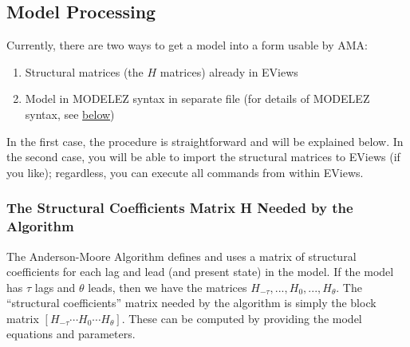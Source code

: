 \documentclass[12pt]{article}
\begin{document}
\subsection{Model Processing}
Currently,  there are two ways to get a model into a form usable by AMA:
\begin{enumerate}
\item Structural matrices (the $H$ matrices) already in EViews
\item Model in MODELEZ syntax in separate file (for details of MODELEZ syntax, see \hyperlink{mez}{below})
\end{enumerate}
In the first case, the procedure is straightforward and will be explained below.  In the second case, you will be able to import the structural matrices to EViews (if you like); regardless, you can execute all commands from within EViews. \\

\subsubsection{The Structural Coefficients Matrix H Needed by the Algorithm}
The Anderson-Moore Algorithm defines and uses a matrix of structural coefficients for each lag and lead (and present state) in the model.  If the model has $\tau$ lags and $\theta$ leads, then we have the matrices $H_{-\tau},...,H_0, ...,H_{\theta}$.  The ``structural coefficients'' matrix needed by the algorithm is simply the block matrix $\left[H_{-\tau}\cdots H_0 \cdots H_{\theta} \right] $.  These can be computed by providing the model equations and parameters.%
\end{document}
